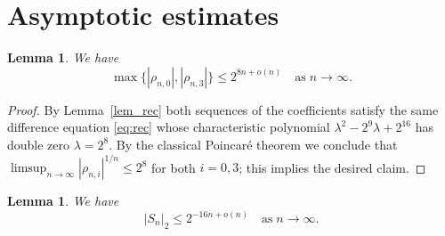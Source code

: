 \documentclass[12pt]{article}
\let\le\leqslant
\newtheorem{lemma}[theorem]{Lemma}
\theoremstyle{remark}
\numberwithin{equation}{section}
\begin{document}
\section{Asymptotic estimates}

\begin{lemma}\label{lem_analysis}
We have
\[ 
\max\{ |\rho_{n,0}|, |\rho_{n,3}| \} \le 2^{8n+o(n)} \quad \text{as}\; n \to \infty.  
\]
\end{lemma}

\begin{proof}
By Lemma~\ref{lem_rec} both sequences of the coefficients satisfy the same difference equation \eqref{eq:rec} whose characteristic polynomial $\lambda^2-2^9\lambda+2^{16}$ has double zero $\lambda=2^8$.
By the classical Poincar\'e theorem we conclude that $\limsup_{n\to\infty}|\rho_{n,i}|^{1/n}\le2^8$ for both $i=0,3$; this implies the desired claim. 
\end{proof}

\begin{lemma}\label{lem_2_adic_estimation}
We have
\[
|S_n|_2 \le 2^{-16n+o(n)} \quad\text{as}\; n \to \infty.
\]
\end{lemma}
\end{document}
